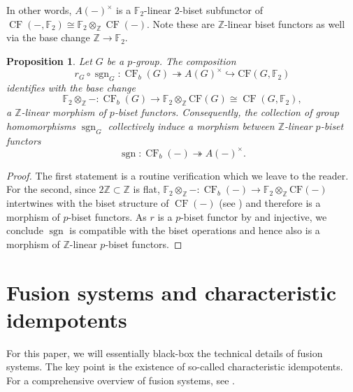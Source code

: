 \documentclass[]{amsart}
\newcommand{\on}[1]{\operatorname{#1}}
\newcommand{\bbF}{\mathbb{F}}
\newcommand{\bbZ}{\mathbb{Z}}
\newcommand{\CF}{\on{CF}}
\newcommand{\sgn}{\on{sgn}}
\newtheorem{proposition}[theorem]{Proposition}
\theoremstyle{remark}
\theoremstyle{definition}
\begin{document}
	In other words, $A(-)^\times$ is a $\bbF_2$-linear $2$-biset subfunctor of $\CF(-, \bbF_2)\cong \bbF_2 \otimes_\bbZ \CF(-)$. Note these are $\bbZ$-linear biset functors as well via the base change $\bbZ \to \bbF_2.$
	
	\begin{proposition}\label{prop:sgn_is_biset_mor}
		Let $G$ be a $p$-group. The composition \[r_G \circ \on{sgn}_G\colon \CF_b(G) \twoheadrightarrow A(G)^\times \hookrightarrow \mathrm{CF}(G, \bbF_2)\] identifies with the base change \[\bbF_2 \otimes_\bbZ- \colon \CF_b(G)\to \bbF_2\otimes_\bbZ\mathrm{CF}(G) \cong \CF(G,\bbF_2),\] a $\bbZ$-linear morphism of $p$-biset functors. Consequently, the collection of group homomorphisms $\on{sgn}_G$ collectively induce a morphism between $\bbZ$-linear $p$-biset functors \[\on{sgn}\colon \CF_b(-) \twoheadrightarrow A(-)^\times.\]
	\end{proposition}
	\begin{proof}
		The first statement is a routine verification which we leave to the reader. For the second, since $2\bbZ \subset \bbZ$ is flat, $\bbF_2 \otimes_\bbZ - \colon \on{CF}_b(-) \to \bbF_2\otimes_\bbZ \mathrm{CF}(-)$ intertwines with the biset structure of $\CF(-)$ (see ) and therefore is a morphism of $p$-biset functors. As $r$ is a $p$-biset functor by  and injective, we conclude $\sgn$ is compatible with the biset operations and hence also is a morphism of $\bbZ$-linear $p$-biset functors. 
		
	\end{proof}
	
	
	\section{Fusion systems and characteristic idempotents}
	
	For this paper, we will essentially black-box the technical details of fusion systems. The key point is the existence of so-called characteristic idempotents. For a comprehensive overview of fusion systems, see \cite{AKO11}.
	
\end{document}
